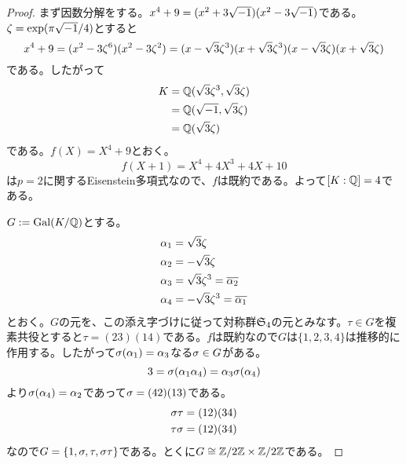 \subsubsection{}%
\begin{proof}
  まず因数分解をする。$x^4 + 9 = (x^2 + 3\sqrt{-1})(x^2 - 3\sqrt{-1})$である。$\zeta = \exp(\pi \sqrt{-1} / 4)$とすると
  \[
  x^4 + 9 = (x^2 - 3 \zeta^6) (x^2 - 3 \zeta^2) = (x - \sqrt{3} \zeta^3 )(x + \sqrt{3} \zeta^3)(x- \sqrt{3} \zeta)(x + \sqrt{3} \zeta)
  \]
  である。したがって
  \begin{align*}
    K &= {\mathbb Q}(\sqrt{3} \zeta^3, \sqrt{3} \zeta) \\
    &= {\mathbb Q}(\sqrt{-1}, \sqrt{3} \zeta) \\
    &= {\mathbb Q}(\sqrt{3} \zeta)
  \end{align*}
  である。$f(X) = X^4 + 9$とおく。
  \[
  f(X+1)= X^4 + 4X^3 + 4X + 10
  \]
  は$p=2$に関するEisenstein多項式なので、$f$は既約である。よって$[K : {\mathbb Q}] = 4$である。

  $G := \operatorname{Gal}(K/{\mathbb Q})$とする。
  \begin{align*}
    {\alpha}_1 &= \sqrt{3} \zeta \\
    {\alpha}_2 &= - \sqrt{3} \zeta \\
    {\alpha}_3 &= \sqrt{3} \zeta^3 = \overline{{\alpha}_2} \\
    {\alpha}_4 &= - \sqrt{3} \zeta^3 = \overline{{\alpha}_1}
  \end{align*}
とおく。$G$の元を、この添え字づけに従って対称群$\mathfrak{S}_4$の元とみなす。$\tau \in G$を複素共役とすると$\tau = (2 3)(1 4)$である。$f$は既約なので$G$は$\{1,2 ,3,4 \}$は推移的に作用する。したがって${\sigma}({\alpha}_1 ) = {\alpha}_3$なる${\sigma} \in G$がある。
\[
3 = {\sigma}({\alpha}_1 {\alpha}_4) = {\alpha}_3 {\sigma}({\alpha}_4)
\]
より${\sigma}({\alpha}_4) = {\alpha}_2$であって${\sigma} = (4 2 ) (1 3)$である。
\begin{align*}
  {\sigma} \tau &= (1 2)(3 4) \\
  \tau {\sigma} &= (1 2)(3 4)
\end{align*}
なので$G = \{ 1, {\sigma}, \tau , {\sigma} \tau \}$である。とくに$G \cong \mathbb{Z} / 2 \mathbb{Z} \times \mathbb{Z} / 2 \mathbb{Z}$である。
\end{proof}
